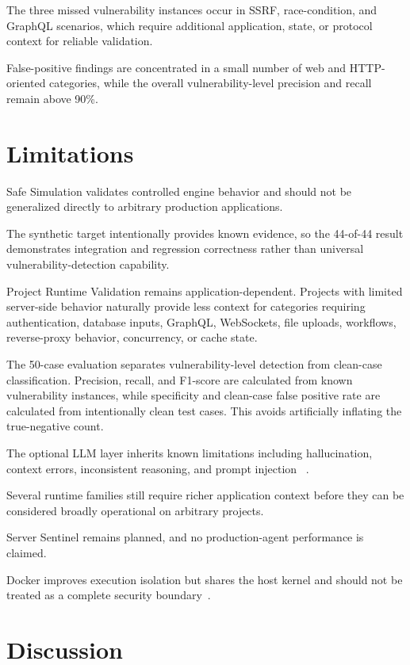\documentclass[journal]{IEEEtran}
\begin{document}
The three missed vulnerability instances occur in SSRF, race-condition, and
GraphQL scenarios, which require additional application, state, or protocol
context for reliable validation.

False-positive findings are concentrated in a small number of web and
HTTP-oriented categories, while the overall vulnerability-level precision
and recall remain above 90\%.

\section{Limitations}

Safe Simulation validates controlled engine behavior and should not be
generalized directly to arbitrary production applications.

The synthetic target intentionally provides known evidence, so the 44-of-44
result demonstrates integration and regression correctness rather than
universal vulnerability-detection capability.

Project Runtime Validation remains application-dependent. Projects with
limited server-side behavior naturally provide less context for categories
requiring authentication, database inputs, GraphQL, WebSockets, file
uploads, workflows, reverse-proxy behavior, concurrency, or cache state.

The 50-case evaluation separates vulnerability-level detection from
clean-case classification. Precision, recall, and F1-score are calculated
from known vulnerability instances, while specificity and clean-case false
positive rate are calculated from intentionally clean test cases. This
avoids artificially inflating the true-negative count.

The optional LLM layer inherits known limitations including hallucination,
context errors, inconsistent reasoning, and prompt injection
~\cite{b4,b13}.

Several runtime families still require richer application context before
they can be considered broadly operational on arbitrary projects.

Server Sentinel remains planned, and no production-agent performance is
claimed.

Docker improves execution isolation but shares the host kernel and should
not be treated as a complete security boundary~\cite{b9}.

\section{Discussion}
\end{document}
